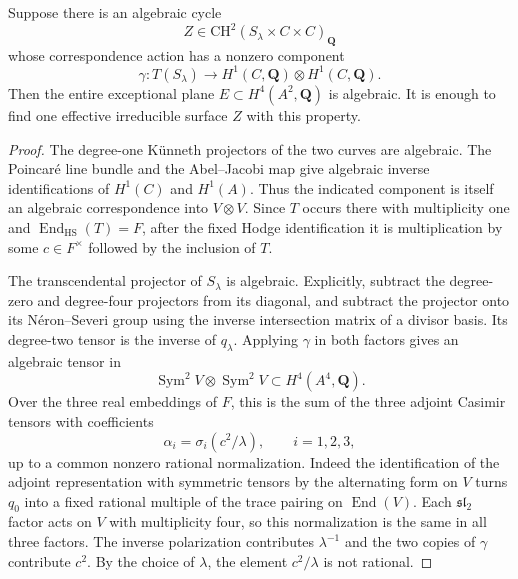 \begin{theorem}\label{thm:mumford-surface}
Suppose there is an algebraic cycle
\[
 Z\in\mathrm{CH}^2(S_\lambda\times C\times C)_{\mathbf Q}
\]
whose correspondence action has a nonzero component
\begin{equation}
 \gamma:T(S_\lambda)\longrightarrow
              H^1(C,\mathbf Q)\otimes H^1(C,\mathbf Q).
 \label{eq:mumford-surface-map}
\end{equation}
Then the entire exceptional plane $E\subset H^4(A^2,\mathbf Q)$ is
algebraic.  It is enough to find one effective irreducible surface $Z$
with this property.
\end{theorem}

\begin{proof}
The degree-one K\"unneth projectors of the two curves are algebraic.
The Poincar\'e line bundle and the Abel--Jacobi map give algebraic
inverse identifications of $H^1(C)$ and $H^1(A)$.  Thus the indicated
component is itself an algebraic correspondence into $V\otimes V$.
Since $T$ occurs there with multiplicity one and
$\operatorname{End}_{\mathrm{HS}}(T)=F$, after the fixed Hodge
identification it is multiplication by some $c\in F^\times$ followed
by the inclusion of $T$.

The transcendental projector of $S_\lambda$ is algebraic.  Explicitly,
subtract the degree-zero and degree-four projectors from its diagonal,
and subtract the projector onto its N\'eron--Severi group using the
inverse intersection matrix of a divisor basis.  Its degree-two tensor
is the inverse of $q_\lambda$.  Applying $\gamma$ in both factors gives
an algebraic tensor in
\[
 \operatorname{Sym}^2V\otimes\operatorname{Sym}^2V
        \subset H^4(A^4,\mathbf Q).
\]
Over the three real embeddings of $F$, this is the sum of the three
adjoint Casimir tensors with coefficients
\begin{equation}
 \alpha_i=\sigma_i(c^2/\lambda),\qquad i=1,2,3,
 \label{eq:mumford-casimir-coeff}
\end{equation}
up to a common nonzero rational normalization. Indeed the identification of the adjoint representation with symmetric tensors by the alternating form on $V$ turns $q_0$ into a fixed rational multiple of the trace pairing on $\operatorname{End}(V)$. Each $\mathfrak{sl}_2$ factor acts on $V$ with multiplicity four, so this normalization is the same in all three factors. The inverse polarization
contributes $\lambda^{-1}$ and the two copies of $\gamma$ contribute
$c^2$.  By the choice of $\lambda$, the element $c^2/\lambda$ is not
rational.


\end{proof}
